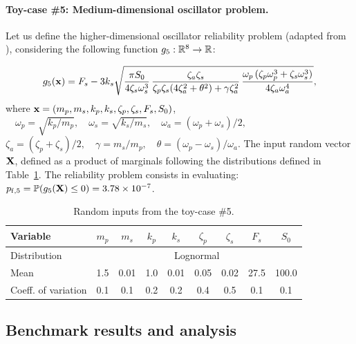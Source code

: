 \paragraph{Toy-case \#5: Medium-dimensional oscillator problem.}
Let us define the higher-dimensional oscillator reliability problem (adapted from ), considering the following function $g_5 : \mathbb{R}^8 \rightarrow \mathbb{R}$:

\begin{equation}
    g_5({\bf x}) = F_s - 3 k_s \sqrt{\frac{\pi S_0}{4 \zeta_s \omega_s^3} \, \frac{\zeta_a \zeta_s}{\zeta_p \zeta_s (4 \zeta_a^2 + \theta^2) + \gamma \zeta_a^2} \, \frac{\omega_p \, (\zeta_p \omega_p^3 + \zeta_s \omega_s^3)}{4 \zeta_a \omega_a^4}},
\end{equation}
where ${\bf x} = \left(m_p, m_s, k_p, k_s, \zeta_p, \zeta_s, F_s, S_0\right)$,  
$\quad \omega_p=\sqrt{k_p/m_p}, \quad \omega_s=\sqrt{k_s/m_s}, \quad \omega_a = (\omega_p + \omega_s)/2, \quad $
$\zeta_a = (\zeta_p + \zeta_s)/2, \quad \gamma = m_s/m_p, \quad \theta= (\omega_p-\omega_s)/\omega_a$. 
The input random vector ${\bf X}$, defined as a product of marginals following the distributions defined in Table~\ref{tab:oscillator}. 
The reliability problem consists in evaluating: $p_{\mathrm{f}, 5} = \mathbb{P} ( g_5({\bf X}) \leq 0 ) =  3.78 \times 10^{-7}$.


\begin{table}[h]
\centering
\begin{tabular}{ lcccccccc }
    \hline
    Variable            & $m_p$ & $m_s$ & $k_p$ & $k_s$ & $\zeta_p$ & $\zeta_s$ & $F_s$ & $S_0$ \\
    \hline          
    Distribution        &  \multicolumn{8}{c}{Lognormal} \\ 
    Mean                & 1.5 & 0.01 & 1.0 & 0.01 & 0.05 & 0.02 & 27.5 & 100.0\\ 
    Coeff. of variation & 0.1 & 0.1 & 0.2 & 0.2 & 0.4 & 0.5 & 0.1 & 0.1\\
    \hline
\end{tabular}
\caption{Random inputs from the toy-case \#5.}
\label{tab:oscillator}
\end{table}

\subsection{Benchmark results and analysis}

